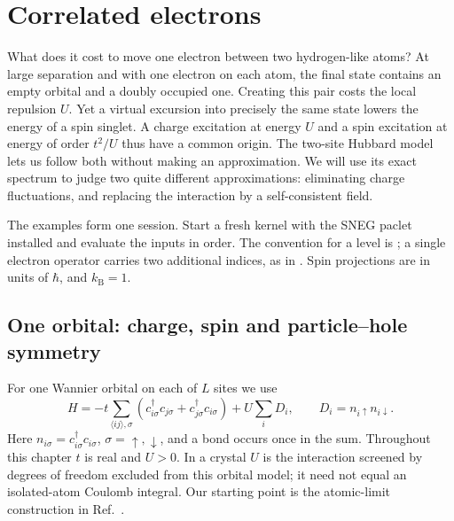 \chapter{Correlated electrons}

What does it cost to move one electron between two hydrogen-like atoms?
At large separation and with one electron on each atom, the final state
contains an empty orbital and a doubly occupied one. Creating this pair
costs the local repulsion $U$. Yet a virtual excursion into precisely the
same state lowers the energy of a spin singlet. A charge excitation at
energy $U$ and a spin excitation at energy of order $t^2/U$ thus have
a common origin. The two-site Hubbard model lets us follow both without
making an approximation. We will use its exact spectrum to judge two
quite different approximations: eliminating charge fluctuations, and
replacing the interaction by a self-consistent field.

The examples form one session. Start a fresh kernel with the SNEG paclet
installed and evaluate the inputs in order. The convention for a level
is ; a single electron operator carries two additional indices,
as in . Spin projections are in units of $\hbar$, and
$k_{\mathrm B}=1$.

\section{One orbital: charge, spin and particle--hole symmetry}
For one Wannier orbital on each of $L$ sites we use
\begin{equation}
 H=-t\sum_{\langle ij\rangle,\sigma}
 (c^\dagger_{i\sigma}c_{j\sigma}+c^\dagger_{j\sigma}c_{i\sigma})
 +U\sum_i D_i,\qquad D_i=n_{i\uparrow}n_{i\downarrow}.
 \label{eq:hubbard}
\end{equation}
Here $n_{i\sigma}=c^\dagger_{i\sigma}c_{i\sigma}$,
$\sigma=\uparrow,\downarrow$, and a bond occurs once in the sum.
Throughout this chapter $t$ is real and $U>0$. In a crystal $U$ is the
interaction screened by degrees of freedom excluded from this orbital
model; it need not equal an isolated-atom Coulomb integral.
Our starting point is the atomic-limit construction in
Ref.~\cite{hubbard}.

\begin{wl}
Needs["sneg`"];
snegfermionoperators[c, d];
snegrealconstants[t, U, \[Epsilon]];
atom = \[Epsilon] number[d[]] + U hubbard[d[]];
{number[d[]], hubbard[d[]]}
\end{wl}

